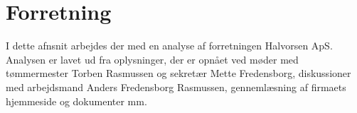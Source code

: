 \section{Forretning} \label{forretning}

I dette afnsnit arbejdes der med en analyse af forretningen Halvorsen ApS.
Analysen er lavet ud fra oplysninger, der er opnået ved møder med tømmermester Torben Rasmussen og sekretær Mette Fredensborg, diskussioner med arbejdsmand Anders Fredensborg Rasmussen, gennemlæsning af firmaets hjemmeside og dokumenter mm.





